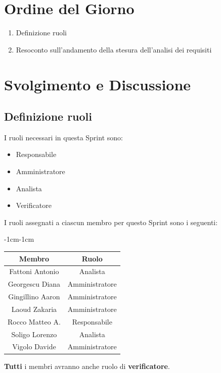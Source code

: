 \documentclass[a4paper,12pt]{article}
\begin{document}
\section{Ordine del Giorno}
\begin{enumerate}[noitemsep]
    \item Definizione ruoli
    \item Resoconto sull'andamento della stesura dell'analisi dei requisiti
\end{enumerate}


\section{Svolgimento e Discussione}


\subsection{Definizione ruoli}
I ruoli necessari in questa Sprint sono:
\begin{itemize}[noitemsep]
    \item Responsabile
    \item Amministratore
    \item Analista
    \item Verificatore
\end{itemize}

I ruoli assegnati a ciascun membro per questo Sprint sono i seguenti:
\begin{table}[H]
    \begin{adjustwidth}{-1cm}{-1cm}
    \centering
\begin{tabular}{|c|c|}
    \hline
    \textbf{Membro} & \textbf{Ruolo} \\
    \hline
    Fattoni Antonio & Analista \\
    \hline
    Georgescu Diana & Amministratore \\
    \hline
    Gingillino Aaron & Amministratore \\
    \hline
    Laoud Zakaria & Amministratore \\
    \hline
    Rocco Matteo A. & Responsabile \\
    \hline
    Soligo Lorenzo & Analista \\
    \hline
    Vigolo Davide & Amministratore \\
    \hline
\end{tabular}
    \end{adjustwidth}
\end{table}
\textbf{Tutti} i membri avranno anche ruolo di \textbf{verificatore}.
\end{document}
